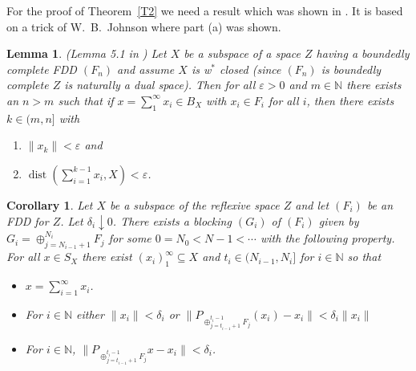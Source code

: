 \documentclass[11pt,leqno]{amsart}
\newtheorem{lem}[thm]{Lemma}
\newtheorem{cor}[thm]{Corollary}
\theoremstyle{definition}
\newcommand{\ds}{\displaystyle}
\newcommand{\vp}{\varepsilon}
\newcommand{\dist}{\operatorname{dist}}
\newcommand{\N}{\mathbb{N}}
\begin{document}
For the proof of Theorem~\ref{T2} we need a result which was shown in 
\cite{KOS}. 
It is based on a trick of W.~B.~Johnson \cite{J2} where part (a) was shown.


\begin{lem}\label{L3} 
{\rm (Lemma 5.1 in \cite{KOS})} 
Let $X$ be a subspace of a space $Z$ having 
a boundedly complete FDD $(F_n)$ and assume
$X$ is w$^*$ closed (since $(F_n)$ is boundedly complete $Z$ is 
naturally a dual space).
Then for all $\vp>0$ and $m\in\N$ there
exists an $n>m$ such that if 
$x= \sum_1^\infty x_i\in B_X$ with $x_i\in F_i$ for all $i$, then 
there exists  $k\in (m,n]$ with 
\begin{enumerate}
\item[a)] $\|x_k\| <\vp$  and 
\item[b)] $\dist (\sum_{i=1}^{k-1} x_i,X)<\vp$.
\end{enumerate}
\end{lem}

\begin{cor}\label{cor:4.4}
Let $X$ be a subspace of the reflexive space $Z$ and let $(F_i)$ be an FDD 
for $Z$. 
Let $\delta_i\downarrow 0$. 
There exists a blocking $(G_i)$ of $(F_i)$ given by 
$G_i = \oplus_{j=N_{i-1} +1}^{N_i} F_j$ for some 
$0= N_0 < N-1 <\cdots$ with the following property. 
For all $x\in S_X$ there exist $(x_i)_1^\infty\subseteq X$ and 
$t_i\in (N_{i-1},N_i]$ for $i\in \N$ so that 
\begin{itemize}
\item[a)] $\ds x=  \sum_{i=1}^\infty x_i$.
\item[b)] For $i\in\N$ either $\|x_i\| <\delta_i$ or 
 $\displaystyle\| P_{\oplus_{j=t_{i-1}+1}^{t_i-1} F_j} (x_i) -x_i\| < \delta_i \|x_i\|$ 
\item[c)] For $i\in\N$, $\|P_{\oplus_{j=t_{i-1}+1}^{t_i-1}F_j} x-x_i\| 
< \delta_i$. 
\end{itemize}
\end{cor}
\end{document}
